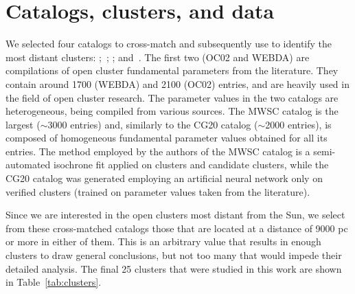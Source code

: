 \documentclass{aa}
\begin{document}
\section{Catalogs, clusters, and data}
 \label{sec:cat_clust_data}

 We selected four catalogs to cross-match and subsequently use to identify the
 most distant clusters: \citet[][the New Catalog of Optically Visible Open Clusters
 and Candidates, hereafter OC02]{Dias_2002};~\citet[][hereafter
 WEBDA\footnote{\url{https://webda.physics.muni.cz/}}]{Netopil_2012};
 \citet[][Milky Way Star Clusters Catalog, hereafter MWSC]{Kharchenko_2012};
 and~\citet[][hereafter CG20]{Cantat_2020}.
 The first two (OC02 and WEBDA) are compilations of open cluster fundamental
 parameters from the literature. They contain around 1700 (WEBDA) and 2100 
 (OC02) entries, and are heavily used in the field of open cluster research.
 The parameter values in the two catalogs are heterogeneous, being compiled from
 various sources.
 The MWSC catalog is the largest  ($\sim$3000 entries) and, similarly to the
 CG20 catalog ($\sim$2000 entries), is composed of homogeneous fundamental
 parameter values obtained for all its entries.
 The method employed by the authors of the MWSC catalog is a semi-automated
 isochrone fit applied on clusters and candidate clusters, while the
 CG20 catalog was generated employing an artificial neural network only on
 verified clusters  (trained on parameter values taken from the
 literature).

 Since we are interested in the open clusters most distant from the Sun, we
 select from these cross-matched catalogs those that are located at a
 distance of 9000 pc or more in either of them. This is an arbitrary value that
 results in enough clusters to draw general conclusions, but not too many that
 would impede their detailed analysis. The final 25 clusters that were
 studied in this work are shown in Table~\ref{tab:clusters}.\\
\end{document}
